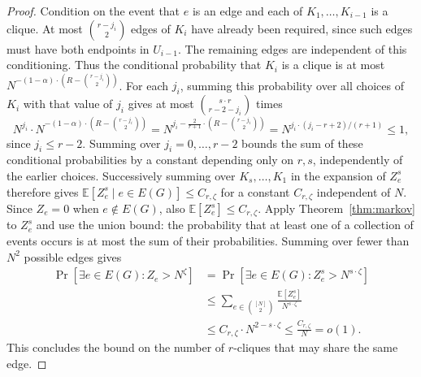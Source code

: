 \begin{proof}
    Condition on the event that $e$ is an edge and each of $K_1,\ldots,K_{i-1}$ is a clique. At most $\binom{r-j_i}{2}$ edges of $K_i$ have already been required, since such edges must have both endpoints in $U_{i-1}$. The remaining edges are independent of this conditioning. Thus the conditional probability that $K_i$ is a clique is at most $N^{-(1-\alpha)\cdot(R-\binom{r-j_i}{2})}$. For each $j_i$, summing this probability over all choices of $K_i$ with that value of $j_i$ gives at most $\binom{s\cdot r}{r-2-j_i}$ times
    \[
        N^{j_i} \cdot N^{-(1-\alpha)\cdot(R-\binom{r-j_i}{2})}
        =N^{j_i-\frac{2}{r+1}\cdot(R-\binom{r-j_i}{2})}
        =N^{j_i\cdot(j_i-r+2)/(r+1)}\leq1,
    \]
    since $j_i\leq r-2$. Summing over $j_i=0,\ldots,r-2$ bounds the sum of these conditional probabilities by a constant depending only on $r,s$, independently of the earlier choices. Successively summing over $K_s,\ldots,K_1$ in the expansion of $Z_e^s$ therefore gives $\mathbb{E}[Z_e^s\mid e\in E(G)]\leq C_{r,\zeta}$ for a constant $C_{r,\zeta}$ independent of $N$.
    Since $Z_e=0$ when $e\notin E(G)$, also $\mathbb{E}[Z_e^s]\leq C_{r,\zeta}$. Apply Theorem~\ref{thm:markov} to $Z_e^s$ and use the union bound: the probability that at least one of a collection of events occurs is at most the sum of their probabilities. Summing over fewer than $N^2$ possible edges gives
    \begin{align*}
        \Pr[\exists e\in E(G)\colon Z_e>N^\zeta]
        &=\Pr[\exists e\in E(G)\colon Z_e^s>N^{s\cdot\zeta}]\\
        &\leq\sum_{e\in\binom{[N]}{2}}\frac{\mathbb{E}[Z_e^s]}{N^{s\cdot\zeta}}\\
        &\leq C_{r,\zeta} \cdot N^{2-s\cdot\zeta}\leq\frac{C_{r,\zeta}}{N}=o(1).
    \end{align*}
    This concludes the bound on the number of $r$-cliques that may share the same edge.


\end{proof}
